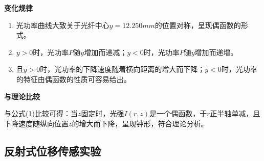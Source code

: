 \documentclass[a4paper,UTF8]{ctexart}
\begin{document}
{\bfseries 变化规律}

\begin{enumerate}
    \item 光功率曲线大致关于光纤中心$y=12.250mm$的位置对称，呈现偶函数的形式。
    \item $y > 0$时，光功率$P$随$y$增加而递减；$y < 0$时，光功率$P$随$y$增加而递增。
    \item 且$y > 0$时，光功率的下降速度随着横向距离的增大而下降；$y<0$时，光功率的特征由偶函数的性质可容易给出。
\end{enumerate}

{\bfseries 与理论比较}

与公式(1)比较可得：当$z$固定时，光强$I(r,z)$是一个偶函数，于$r$正半轴单减，且下降速度随纵向位置$z$的增大而下降，呈现钟形，符合理论分析。

\subsection{反射式位移传感实验}
\end{document}
